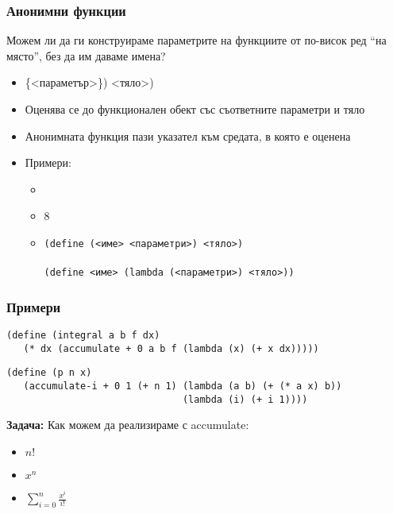 \documentclass{beamer}
\begin{document}
\begin{frame}
  \frametitle{Анонимни функции}

  Можем ли да ги конструираме параметрите на функциите от по-висок ред ``на място'', без да им даваме имена?\\[0.5em]
  \pause
  \begin{itemize}[<+->]
  \item {}\{<параметър>\}\tta) <тяло>\tta)
  \item Оценява се до функционален обект със съответните параметри и тяло
  \item \alert{Анонимната функция пази указател към средата, в която е оценена}
  \item Примери:
    \begin{itemize}
    \item {}
    \item {}8
    \item
        \tt{(define (}<име> <параметри>\tt) <тяло>\tt)\\
        \eqv\\
        \tt{(define }<име> \tt{(lambda (}<параметри>\tt) <тяло>\tt{))}
    \end{itemize}
  \end{itemize}
\end{frame}

\begin{frame}[fragile]
  \frametitle{Примери}

\begin{lstlisting}
(define (integral a b f dx)
   (* dx (accumulate + 0 a b f (lambda (x) (+ x dx)))))
\end{lstlisting}
\pause
\begin{lstlisting}
(define (p n x)
   (accumulate-i + 0 1 (+ n 1) (lambda (a b) (+ (* a x) b))
                               (lambda (i) (+ i 1))))
\end{lstlisting}
\pause
\textbf{Задача:} Как можем да реализираме с accumulate:
\begin{itemize}[<+->]
\item $n!$
\item $x^n$
\item $\sum_{i=0}^n \frac{x^i}{i!}$
\end{itemize}
\end{frame}
\end{document}
